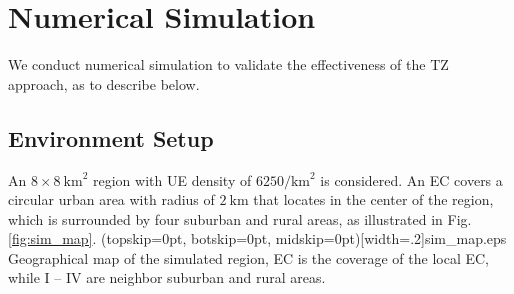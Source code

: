 \documentclass{ieeeaccess}
\begin{document}
	\section{Numerical Simulation}\label{sec:simulation}
	We conduct numerical simulation to validate the effectiveness of the TZ approach, as to describe below.
	\subsection{Environment Setup}
	An $8\times 8~\text{km}^2$ region with UE density of $6250/\text{km}^2$ is considered. An EC covers a circular urban area with radius of $2~\text{km}$ that locates in the center of the region, which is surrounded by four suburban and rural areas, as illustrated in Fig. \ref{fig:sim_map}.  
	\Figure[htbp!](topskip=0pt, botskip=0pt, midskip=0pt)[width=.2\textwidth]{sim_map.eps}
	{Geographical map of the simulated region, EC is the coverage of the local EC, while I -- IV are neighbor suburban and rural areas.\label{fig:sim_map}}	
	
\end{document}
